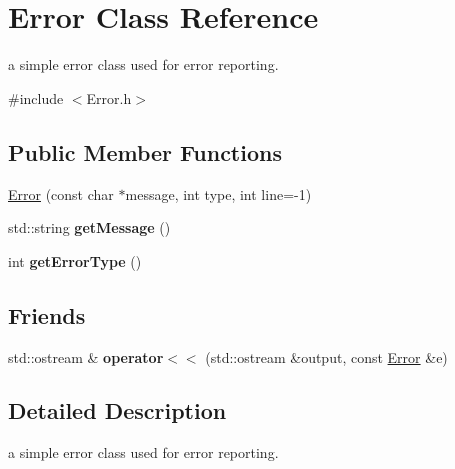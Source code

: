 \hypertarget{classError}{
\section{Error Class Reference}
\label{classError}
}


a simple error class used for error reporting.  




{\ttfamily \#include $<$Error.h$>$}

\subsection*{Public Member Functions}
\begin{DoxyCompactItemize}
\item 
\hyperlink{classError_a2e43003eea1c47c3e8260e15f0ad1c35}{Error} (const char $\ast$message, int type, int line=-\/1)
\item 
\hypertarget{classError_a97b2e55d4669c55240c5d7daa737cabb}{
std::string {\bfseries getMessage} ()}
\label{classError_a97b2e55d4669c55240c5d7daa737cabb}

\item 
\hypertarget{classError_a1b440709907359bc169a2df46f9e171f}{
int {\bfseries getErrorType} ()}
\label{classError_a1b440709907359bc169a2df46f9e171f}

\end{DoxyCompactItemize}
\subsection*{Friends}
\begin{DoxyCompactItemize}
\item 
\hypertarget{classError_add0e5baec89fb7ee3113c2aa075019ab}{
std::ostream \& {\bfseries operator$<$$<$} (std::ostream \&output, const \hyperlink{classError}{Error} \&e)}
\label{classError_add0e5baec89fb7ee3113c2aa075019ab}

\end{DoxyCompactItemize}


\subsection{Detailed Description}
a simple error class used for error reporting. 


